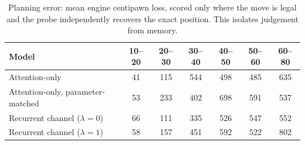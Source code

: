\begin{table}[t]
\centering\small
\caption{Planning error: mean engine centipawn loss, scored only where the
move is legal and the probe independently recovers the exact position.
This isolates judgement from memory.}
\label{tab:eplan}
\begin{tabular}{lcccccc}
\toprule
Model & 10--20 & 20--30 & 30--40 & 40--50 & 50--60 & 60--80 \\
\midrule
Attention-only & 41 & 115 & 544 & 498 & 485 & 635 \\
Attention-only, parameter-matched & 53 & 233 & 402 & 698 & 591 & 537 \\
Recurrent channel ($\lambda{=}0$) & 66 & 111 & 335 & 526 & 547 & 552 \\
Recurrent channel ($\lambda{=}1$) & 58 & 157 & 451 & 592 & 522 & 802 \\
\bottomrule
\end{tabular}
\end{table}
